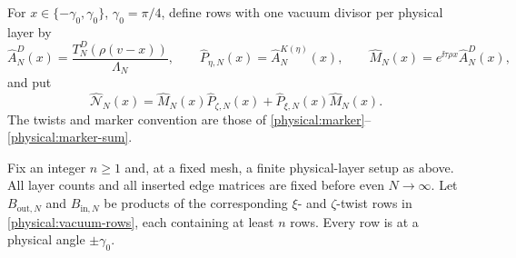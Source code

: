 For \(x\in\{-\gamma_0,\gamma_0\}\), \(\gamma_0=\pi/4\), define rows with
one vacuum divisor per physical layer by
\begin{equation}\label{physical:vacuum-rows}
 \widehat A_N^D(x)=\frac{T_N^D(\rho(v-x))}{\Lambda_N},\qquad
 \widehat P_{\eta,N}(x)=\widehat A_N^{K(\eta)}(x),\qquad
 \widehat M_N(x)=e^{\ii\tau\rho x}\widehat A_N^D(x),
\end{equation}
and put
\[
 \widehat{\mathcal N}_N(x)=
 \widehat M_N(x)\widehat P_{\zeta,N}(x)
 +\widehat P_{\xi,N}(x)\widehat M_N(x).
\]
The twists and marker convention are those of
\eqref{physical:marker}--\eqref{physical:marker-sum}.

\begin{theorem}\label{thm:physical-transfer}
Fix an integer \(n\ge1\) and, at a fixed mesh, a finite physical-layer
setup as above.  All layer counts and all inserted edge matrices are fixed
before even \(N\to\infty\).  Let \(B_{\mathrm{out},N}\) and
\(B_{\mathrm{in},N}\) be products of the corresponding \(\xi\)- and
\(\zeta\)-twist rows in \eqref{physical:vacuum-rows}, each containing at
least \(n\) rows.  Every row is at a physical angle \(\pm\gamma_0\).


\end{theorem}
